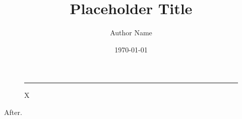 \documentclass[
	verbose,
	english,
	type=bachelor-thesis, %
	field=Computer\ Science, %
	license=CCBY, %
	paper=a4,  %
]{thesis}
\title{Placeholder Title}
\author{Author Name}
\date{\today}
\begin{document}
\maketitle
\begin{figure}[h!]\rule{1cm}{2cm}\caption{X}\end{figure}
After.
\gdef\SatexReachedEnd{}
\end{document}

